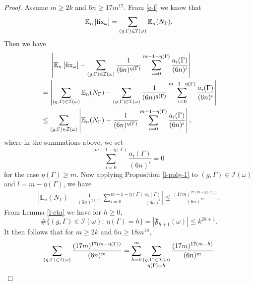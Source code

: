 \documentclass{amsart}
\theoremstyle{plain}
\theoremstyle{definition}
\theoremstyle{remark}
\begin{document}
\begin{proof}
      Assume $m\geq 2k$ and $6n\geq 17m^{17}$. From \eqref{e-f} we know that
     \[\mathbb{E}_n\left[\textnormal{fix}_{\omega}\right]=\sum\limits_{(g,\Gamma)\in\mathcal{I}(\omega)}\mathbb{E}_n(N_{\Gamma}).\]
     Then we have
     \begin{equation}
        \begin{aligned}\label{e-tr-1}
            &\ \ \ \ \left|\mathbb{E}_n\left[\textnormal{fix}_{\omega}\right]-\sum\limits_{(g,\Gamma)\in\mathcal{I}(\omega)}\frac{1}{(6n)^{\eta(\Gamma)}}\sum\limits_{i=0}^{m-1-\eta(\Gamma)}\frac{a_i(\Gamma)}{(6n)^i}\right|\\
            &=\left|\sum\limits_{(g,\Gamma)\in\mathcal{I}(\omega)}\mathbb{E}_n(N_{\Gamma})-\sum\limits_{(g,\Gamma)\in\mathcal{I}(\omega)}\frac{1}{(6n)^{\eta(\Gamma)}}\sum\limits_{i=0}^{m-1-\eta(\Gamma)}\frac{a_i(\Gamma)}{(6n)^i}\right| \\
    &\leq\sum\limits_{(g,\Gamma)\in\mathcal{I}(\omega)}\left|\mathbb{E}_n(N_{\Gamma})-\frac{1}{(6n)^{\eta(\Gamma)}}\sum\limits_{i=0}^{m-1-\eta(\Gamma)}\frac{a_i(\Gamma)}{(6n)^i}\right|,
        \end{aligned}
        \end{equation}
        where in the summations above, we set
        $$\sum\limits_{i=0}^{m-1-\eta(\Gamma)}\frac{a_i(\Gamma)}{(6n)^i}=0$$
        for the case $\eta(\Gamma)\geq m$. Now applying Proposition \ref{l-poly-1} to $(g,\Gamma)\in\mathcal{I}(\omega)$ and $l=m-\eta(\Gamma)$, we have
        \begin{align}\label{e-tr-2}
            \left|\mathbb{E}_n(N_{\Gamma})-\frac{1}{(6n)^{\eta(\Gamma)}}\sum\limits_{i=0}^{m-1-\eta(\Gamma)}\frac{a_i(\Gamma)}{(6n)^i}\right|\leq \frac{(17m)^{17(m-\eta(\Gamma))}}{(6n)^{m}}.
        \end{align}
        From Lemma \ref{l-eta} we have for $h\geq 0$,
        $$\#\{(g,\Gamma)\in\mathcal{I}(\omega);\ \eta(\Gamma)=h\}=|\mathfrak{F}_{h+1}(\omega)|\leq k^{2h+1}.$$
        It then follows that for $m\geq 2k$ and $6n\geq 18m^{18}$,
        \begin{equation}
        \begin{aligned}\label{e-tr-3}
            \sum\limits_{(g,\Gamma)\in\mathcal{I}(\omega)}\frac{(17m)^{17(m-\eta(\Gamma))}}{(6n)^{m}}&=\sum\limits_{h=0}^\infty\sum\limits\limits_{\substack{(g,\Gamma)\in\mathcal{I}(\omega)\\ \eta(\Gamma)=h}}\frac{(17m)^{17(m-h)}}{(6n)^{m}}\\

\end{aligned}
\end{equation}
\end{proof}
\end{document}
